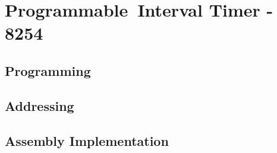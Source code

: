 \section{Programmable Interval Timer - 8254}

    \subsection{Programming}

    \subsection{Addressing}

    \subsection{Assembly Implementation}
